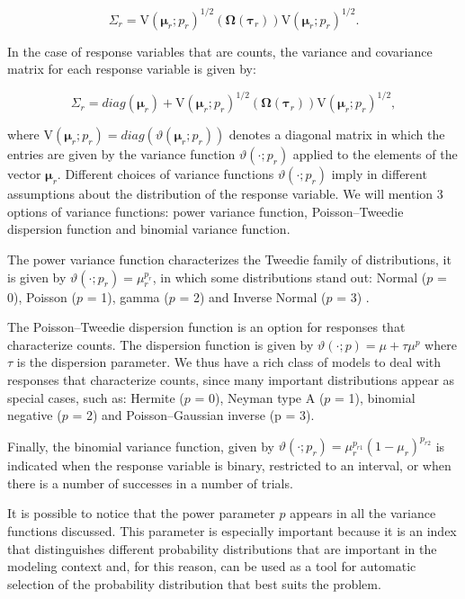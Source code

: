 \documentclass[AMA,STIX1COL]{WileyNJD-v2}
\begin{document}
$$
\Sigma_r =
\mathrm{V}\left(\boldsymbol{\mu}_r; p_r\right)^{1/2}(\boldsymbol{\Omega}\left(\boldsymbol{\tau}_r\right))\mathrm{V}\left(\boldsymbol{\mu}_r; p_r\right)^{1/2}.
$$

In the case of response variables that are counts, the variance and covariance matrix for each response variable is given by:

$$
\Sigma_r = diag(\boldsymbol{\mu}_r)+ \mathrm{V}\left(\boldsymbol{\mu}_r; p_r\right)^{1/2}(\boldsymbol{\Omega}\left(\boldsymbol{\tau}_r\right))\mathrm{V}\left(\boldsymbol{\mu}_r; p_r\right)^{1/2},
$$

\noindent where $\mathrm{V}\left(\boldsymbol{\mu}_r; p_r\right) = diag(\vartheta(\boldsymbol{\mu}_r; p_r))$ denotes a diagonal matrix in which the entries are given by the variance function $\vartheta(\cdot; p_r)$ applied to the elements of the vector $\boldsymbol{\mu}_r$. Different choices of variance functions $\vartheta(\cdot; p_r)$ imply in different assumptions about the distribution of the response variable. We will mention 3 options of variance functions: power variance function, Poisson–Tweedie dispersion function and binomial variance function.

The power variance function characterizes the Tweedie family of distributions, it is given by $\vartheta\left(\cdot; p_r\right) = \mu^{p_r}_r$, in which some distributions stand out: Normal ($p $ = 0), Poisson ($p$ = 1), gamma ($p$ = 2) and Inverse Normal ($p$ = 3) \cite{Jorgensen87, Jorgensen97}. 

The Poisson–Tweedie dispersion function \cite{Jorgensen15} is an option for responses that characterize counts. The dispersion function is given by $\vartheta\left(\cdot; p\right) = \mu + \tau\mu^p$ where $\tau$ is the dispersion parameter. We thus have a rich class of models to deal with responses that characterize counts, since many important distributions appear as special cases, such as: Hermite ($p$ = 0), Neyman type A ($p$ = 1), binomial negative ($p$ = 2) and Poisson–Gaussian inverse (p = $3$).

Finally, the binomial variance function, given by $\vartheta\left(\cdot; p_r\right) = \mu^{p_{r1}}_r(1 - \mu_r)^{p_{r2}}$ is indicated when the response variable is binary, restricted to an interval, or when there is a number of successes in a number of trials.

It is possible to notice that the power parameter $p$ appears in all the variance functions discussed. This parameter is especially important because it is an index that distinguishes different probability distributions that are important in the modeling context and, for this reason, can be used as a tool for automatic selection of the probability distribution that best suits the problem.
\end{document}
